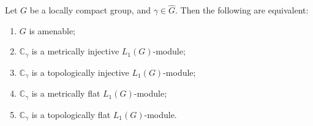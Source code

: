 \begin{proposition}\label{OneDimL1ModMetTopInjFlatCharac} Let $G$ be a locally
compact group, and $\gamma\in\widehat{G}$. Then the following are equivalent:

\begin{enumerate}[label = (\roman*)]
    \item $G$ is amenable;

    \item $\mathbb{C}_\gamma$ is a metrically injective $L_1(G)$-module;

    \item $\mathbb{C}_\gamma$ is a topologically injective $L_1(G)$-module;

    \item $\mathbb{C}_\gamma$ is a metrically flat $L_1(G)$-module;

    \item $\mathbb{C}_\gamma$ is a topologically flat $L_1(G)$-module.
\end{enumerate}
\end{proposition}
